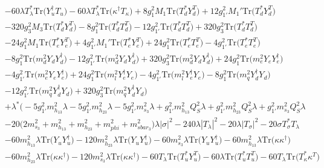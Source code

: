 {\begin{align}
 &-60 \lambda T_{\lambda}^* \mbox{Tr}\Big({Y_{u}^{\dagger}  T_u}\Big) -60 \lambda T_{\lambda}^* \mbox{Tr}\Big({\kappa^{\dagger}  T_{\kappa}}\Big) +8 g_{1}^{2} M_1 \mbox{Tr}\Big({T_d^*  Y_{d}^{T}}\Big) +12 g_{1'}^{2} M_1' \mbox{Tr}\Big({T_d^*  Y_{d}^{T}}\Big) \nonumber \\ 
 &-320 g_{3}^{2} M_3 \mbox{Tr}\Big({T_d^*  Y_{d}^{T}}\Big) -8 g_{1}^{2} \mbox{Tr}\Big({T_d^*  T_{d}^{T}}\Big) -12 g_{1'}^{2} \mbox{Tr}\Big({T_d^*  T_{d}^{T}}\Big) +320 g_{3}^{2} \mbox{Tr}\Big({T_d^*  T_{d}^{T}}\Big) \nonumber \\ 
 &-24 g_{1}^{2} M_1 \mbox{Tr}\Big({T_e^*  Y_{e}^{T}}\Big) +4 g_{1'}^{2} M_1' \mbox{Tr}\Big({T_e^*  Y_{e}^{T}}\Big) +24 g_{1}^{2} \mbox{Tr}\Big({T_e^*  T_{e}^{T}}\Big) -4 g_{1'}^{2} \mbox{Tr}\Big({T_e^*  T_{e}^{T}}\Big) \nonumber \\ 
 &-8 g_{1}^{2} \mbox{Tr}\Big({m_d^2  Y_d  Y_{d}^{\dagger}}\Big) -12 g_{1'}^{2} \mbox{Tr}\Big({m_d^2  Y_d  Y_{d}^{\dagger}}\Big) +320 g_{3}^{2} \mbox{Tr}\Big({m_d^2  Y_d  Y_{d}^{\dagger}}\Big) +24 g_{1}^{2} \mbox{Tr}\Big({m_e^2  Y_e  Y_{e}^{\dagger}}\Big) \nonumber \\ 
 &-4 g_{1'}^{2} \mbox{Tr}\Big({m_e^2  Y_e  Y_{e}^{\dagger}}\Big) +24 g_{1}^{2} \mbox{Tr}\Big({m_l^2  Y_{e}^{\dagger}  Y_e}\Big) -4 g_{1'}^{2} \mbox{Tr}\Big({m_l^2  Y_{e}^{\dagger}  Y_e}\Big) -8 g_{1}^{2} \mbox{Tr}\Big({m_q^2  Y_{d}^{\dagger}  Y_d}\Big) \nonumber \\ 
 &-12 g_{1'}^{2} \mbox{Tr}\Big({m_q^2  Y_{d}^{\dagger}  Y_d}\Big) +320 g_{3}^{2} \mbox{Tr}\Big({m_q^2  Y_{d}^{\dagger}  Y_d}\Big) \nonumber \\ 
 &+\lambda^* \Big(-5 g_{1'}^{2} m_{h_{13}}^2 \lambda -5 g_{1'}^{2} m_{h_{23}}^2 \lambda -5 g_{1'}^{2} m_{s_3}^2 \lambda +g_{1'}^{2} m_{h_{13}}^2 Q_{S}^{2} \lambda +g_{1'}^{2} m_{h_{23}}^2 Q_{S}^{2} \lambda +g_{1'}^{2} m_{s_3}^2 Q_{S}^{2} \lambda \nonumber \\ 
 &-20 \Big(2 m_{s_3}^2  + m_{h_{13}}^2 + m_{h_{23}}^2 + m_{phi}^2 + m_{sbar_3}^2\Big)\lambda |\sigma|^2 -240 \lambda |T_{\lambda}|^2 -20 \lambda |T_{\sigma}|^2 -20 \sigma T_{\sigma}^* T_{\lambda} \nonumber \\ 
 &-60 m_{h_{13}}^2 \lambda \mbox{Tr}\Big({Y_u  Y_{u}^{\dagger}}\Big) -120 m_{h_{23}}^2 \lambda \mbox{Tr}\Big({Y_u  Y_{u}^{\dagger}}\Big) -60 m_{s_3}^2 \lambda \mbox{Tr}\Big({Y_u  Y_{u}^{\dagger}}\Big) -60 m_{h_{13}}^2 \lambda \mbox{Tr}\Big({\kappa  \kappa^{\dagger}}\Big) \nonumber \\ 
 &-60 m_{h_{23}}^2 \lambda \mbox{Tr}\Big({\kappa  \kappa^{\dagger}}\Big) -120 m_{s_3}^2 \lambda \mbox{Tr}\Big({\kappa  \kappa^{\dagger}}\Big) -60 T_{\lambda} \mbox{Tr}\Big({T_u^*  Y_{u}^{T}}\Big) -60 \lambda \mbox{Tr}\Big({T_u^*  T_{u}^{T}}\Big) -60 T_{\lambda} \mbox{Tr}\Big({T_{\kappa}^*  \kappa^{T}}\Big) \nonumber \\ 

\end{align}}
